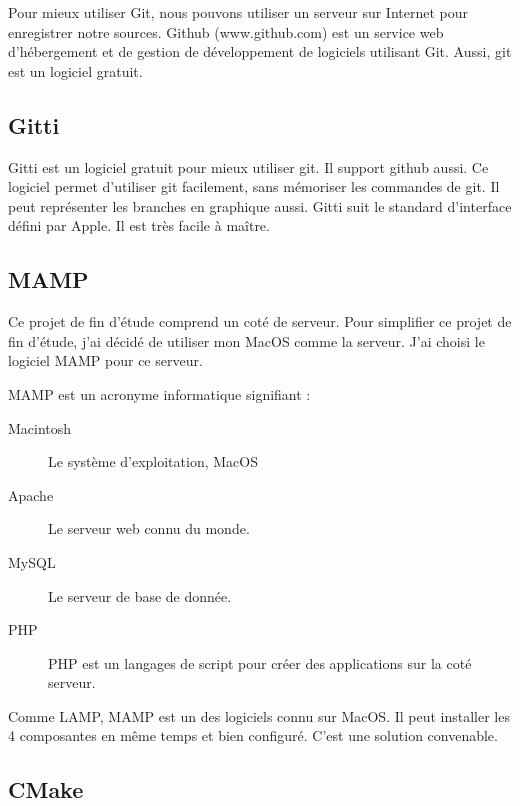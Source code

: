 Pour mieux utiliser Git, nous pouvons utiliser un serveur sur Internet pour enregistrer notre sources. Github (www.github.com) est un service web d'hébergement et de gestion de développement de logiciels utilisant Git. Aussi, git est un logiciel gratuit.



\subsection{Gitti} %
\label{sub:gitti}

Gitti est un logiciel gratuit pour mieux utiliser git. Il support github aussi. Ce logiciel permet d'utiliser git facilement, sans mémoriser les commandes de git. Il peut représenter les branches en graphique aussi. Gitti suit le standard d'interface défini par Apple. Il est très facile à maître. 



\subsection{MAMP} %
\label{sub:mamp}

Ce projet de fin d'étude comprend un coté de serveur. Pour simplifier ce projet de fin d'étude, j'ai décidé de utiliser mon MacOS comme la serveur. J'ai choisi le logiciel MAMP pour ce serveur.

MAMP est un acronyme informatique signifiant : 

\begin{description}
	\item[Macintosh] Le système d'exploitation, MacOS 
	\item[Apache] Le serveur web connu du monde.
	\item[MySQL] Le serveur de base de donnée.
	\item[PHP] PHP est un langages de script pour créer des applications sur la coté serveur.
\end{description}

Comme LAMP, MAMP est un des logiciels connu sur MacOS. Il peut installer les 4 composantes en même temps et bien configuré. C'est une solution convenable. 


\subsection{CMake} %
\label{sub:mamp}

